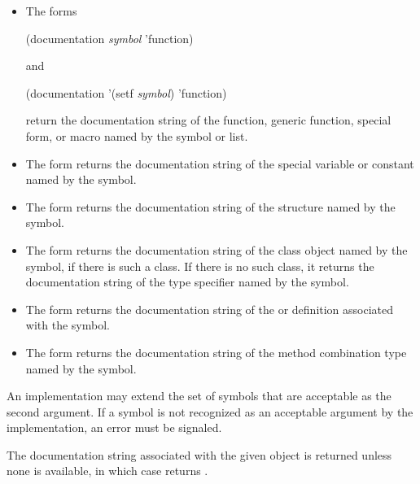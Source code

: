 \begin{defun}
\begin{itemize}
\begin{itemize}
\item
The forms
\begin{lisp}
(documentation {\it symbol\/} 'function)
\end{lisp}
and
\begin{lisp}
(documentation '(setf {\it symbol\/}) 'function)
\end{lisp}
return the
documentation string of the function, generic function, special form, or
macro named by the symbol or list.

\item
The form  returns the
documentation string of the special variable or constant named by the
symbol.

\item
The form  returns the
documentation string of the  structure named by the
symbol.

\item
The form  returns the documentation
string of the class object named by the symbol, if there is such a
class.   If there is no such class, it returns the documentation string
of the type specifier named by the symbol. 

\item
The form  returns the documentation
string of the  or  definition
associated with the symbol.

\item
The form  returns the
documentation string of the method combination type named by the
symbol.  
\end{itemize}

\end{itemize}

An implementation may extend the set of symbols that are acceptable as
the second argument.  If a symbol is not recognized as an acceptable
argument by the implementation, an error must be signaled.


The documentation string associated with the given object is returned
unless none is available, in which case  returns
.

\end{defun}


